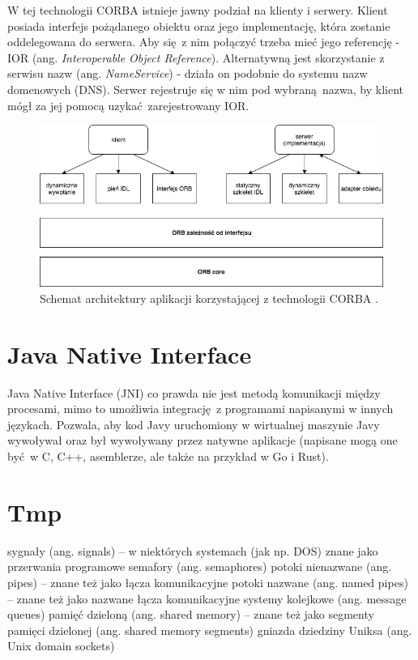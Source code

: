 W tej technologii CORBA istnieje jawny podział na klienty i serwery. Klient posiada interfejs pożądanego obiektu oraz jego implementację, która zostanie oddelegowana do serwera. Aby się z nim połączyć trzeba mieć jego referencję - IOR (ang. \textit{Interoperable Object Reference}). Alternatywną jest skorzystanie z serwisu nazw (ang. \textit{NameService}) - działa on podobnie do systemu nazw domenowych (DNS). Serwer rejestruje się w nim pod wybraną nazwa, by klient mógł za jej pomocą uzykać zarejestrowany IOR.

\begin{figure}[h]
    \centering
    \includegraphics[width=\linewidth]{img/CORBA_architecture.png}
    \caption{Schemat architektury aplikacji korzystającej z technologii CORBA \cite{Saw02}.}
    \label{fig:CORBA_architecture}
\end{figure}


\section{Java Native Interface}

Java Native Interface (JNI) co prawda nie jest metodą komunikacji między procesami, mimo to umożliwia integrację z programami napisanymi w innych językach. Pozwala, aby kod Javy uruchomiony w wirtualnej maszynie Javy wywoływał oraz był wywoływany przez natywne aplikacje (napisane mogą one być w C, C++, asemblerze, ale także na przykład w Go i Rust).


\section{Tmp}

sygnały (ang. signals) – w niektórych systemach (jak np. DOS) znane jako przerwania programowe
semafory (ang. semaphores)
potoki nienazwane (ang. pipes) – znane też jako łącza komunikacyjne
potoki nazwane (ang. named pipes) – znane też jako nazwane łącza komunikacyjne
systemy kolejkowe (ang. message queues)
pamięć dzieloną (ang. shared memory) – znane też jako segmenty pamięci dzielonej (ang. shared memory segments)
gniazda dziedziny Uniksa (ang. Unix domain sockets)



